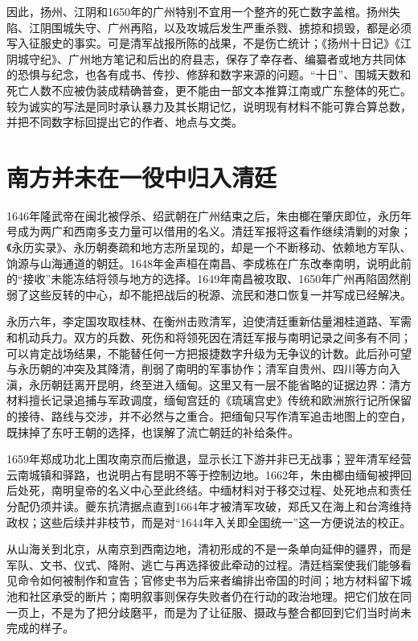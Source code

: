 因此，扬州、江阴和1650年的广州特别不宜用一个整齐的死亡数字盖棺。扬州失陷、江阴围城失守、广州再陷，以及攻城后发生严重杀戮、掳掠和损毁，都是必须写入征服史的事实。可是清军战报所陈的战果，不是伤亡统计；《扬州十日记》《江阴城守纪》、广州地方笔记和后出的府县志，保存了幸存者、编纂者或地方共同体的恐惧与纪念，也各有成书、传抄、修辞和数字来源的问题。“十日”、围城天数和死亡人数不应被伪装成精确普查，更不能由一部文本推算江南或广东整体的死亡。较为诚实的写法是同时承认暴力及其长期记忆，说明现有材料不能可靠合算总数，并把不同数字标回提出它的作者、地点与文类。

\section{南方并未在一役中归入清廷}

1646年隆武帝在闽北被俘杀、绍武朝在广州结束之后，朱由榔在肇庆即位，永历年号成为两广和西南多支力量可以借用的名义。清廷军报将这看作继续清剿的对象；《永历实录》、永历朝奏疏和地方志所呈现的，却是一个不断移动、依赖地方军队、饷源与山海通道的朝廷。1648年金声桓在南昌、李成栋在广东改奉南明，说明此前的“接收”未能冻结将领与地方的选择。1649年南昌被攻取、1650年广州再陷固然削弱了这些反转的中心，却不能把战后的税源、流民和港口恢复一并写成已经解决。

永历六年，李定国攻取桂林、在衡州击败清军，迫使清廷重新估量湘桂道路、军需和机动兵力。双方的兵数、死伤和将领死因在清廷军报与南明记录之间多有不同；可以肯定战场结果，不能替任何一方把报捷数字升级为无争议的计数。此后孙可望与永历朝的冲突及其降清，削弱了南明的军事协作；清军自贵州、四川等方向入滇，永历朝廷离开昆明，终至进入缅甸。这里又有一层不能省略的证据边界：清方材料擅长记录追捕与军政调度，缅甸宫廷的《琉璃宫史》传统和欧洲旅行记所保留的接待、路线与交涉，并不必然与之重合。把缅甸只写作清军追击地图上的空白，既抹掉了东吁王朝的选择，也误解了流亡朝廷的补给条件。

1659年郑成功北上围攻南京而后撤退，显示长江下游并非已无战事；翌年清军经营云南城镇和驿路，也说明占有昆明不等于控制边地。1662年，朱由榔由缅甸被押回后处死，南明皇帝的名义中心至此终结。中缅材料对于移交过程、处死地点和责任分配仍须并读。夔东抗清据点直到1664年才被清军攻破，郑氏又在海上和台湾维持政权；这些后续并非枝节，而是对“1644年入关即全国统一”这一方便说法的校正。

从山海关到北京，从南京到西南边地，清初形成的不是一条单向延伸的疆界，而是军队、文书、仪式、降附、逃亡与再选择彼此牵动的过程。清廷档案使我们能够看见命令如何被制作和宣告；官修史书为后来者编排出帝国的时间；地方材料留下城池和社区承受的断片；南明叙事则保存失败者仍在行动的政治地理。把它们放在同一页上，不是为了把分歧磨平，而是为了让征服、摄政与整合都回到它们当时尚未完成的样子。

